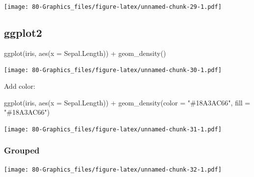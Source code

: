 \documentclass[
]{book}
\newenvironment{Shaded}{\begin{snugshade}}{\end{snugshade}}
\newcommand{\AttributeTok}[1]{\textcolor[rgb]{0.77,0.63,0.00}{#1}}
\newcommand{\FunctionTok}[1]{\textcolor[rgb]{0.00,0.00,0.00}{#1}}
\newcommand{\NormalTok}[1]{#1}
\newcommand{\SpecialCharTok}[1]{\textcolor[rgb]{0.00,0.00,0.00}{#1}}
\newcommand{\StringTok}[1]{\textcolor[rgb]{0.31,0.60,0.02}{#1}}
\begin{document}
\texttt{[image: 80-Graphics\_files/figure-latex/unnamed-chunk-29-1.pdf]}

\hypertarget{ggplot2-3}{%
\subsection{\texorpdfstring{\textbf{ggplot2}}{ggplot2}}\label{ggplot2-3}}

\begin{Shaded}
\begin{Highlighting}[]
\FunctionTok{ggplot}\NormalTok{(iris, }\FunctionTok{aes}\NormalTok{(}\AttributeTok{x =}\NormalTok{ Sepal.Length)) }\SpecialCharTok{+} \FunctionTok{geom\_density}\NormalTok{()}
\end{Highlighting}
\end{Shaded}

\texttt{[image: 80-Graphics\_files/figure-latex/unnamed-chunk-30-1.pdf]}

Add color:

\begin{Shaded}
\begin{Highlighting}[]
\FunctionTok{ggplot}\NormalTok{(iris, }\FunctionTok{aes}\NormalTok{(}\AttributeTok{x =}\NormalTok{ Sepal.Length)) }\SpecialCharTok{+} \FunctionTok{geom\_density}\NormalTok{(}\AttributeTok{color =} \StringTok{"\#18A3AC66"}\NormalTok{, }\AttributeTok{fill =} \StringTok{"\#18A3AC66"}\NormalTok{)}
\end{Highlighting}
\end{Shaded}

\texttt{[image: 80-Graphics\_files/figure-latex/unnamed-chunk-31-1.pdf]}

\hypertarget{grouped-1}{%
\subsubsection{Grouped}\label{grouped-1}}

\begin{Shaded}
\end{Shaded}

\texttt{[image: 80-Graphics\_files/figure-latex/unnamed-chunk-32-1.pdf]}

\begin{Shaded}
\end{Shaded}
\end{document}
